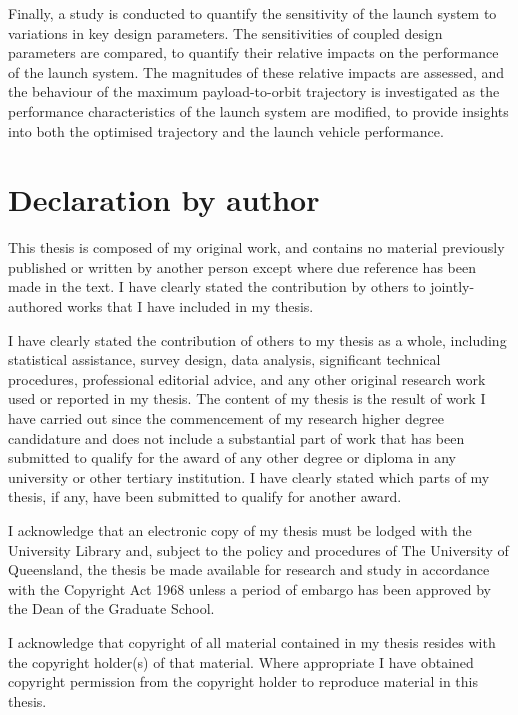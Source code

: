 Finally, a study is conducted to quantify the sensitivity of the launch system to variations in key design parameters. 
The sensitivities of coupled design parameters are compared, to quantify their relative impacts on the performance of the launch system. The magnitudes of these relative impacts are assessed, and the behaviour of the maximum payload-to-orbit trajectory is investigated as the performance characteristics of the launch system are modified, to provide insights into both the optimised trajectory and the launch vehicle performance. 

 

\clearpage
\section*{Declaration by author}

  This thesis is composed of my original work, and contains no material previously published or written by another person except where due reference has been made in the text. I have clearly stated the contribution by others to jointly-authored works that I have included in my thesis.

  I have clearly stated the contribution of others to my thesis as a whole, including statistical assistance, survey design, data analysis, significant technical procedures, professional editorial advice, and any other original research work used or reported in my thesis. The content of my thesis is the result of work I have carried out since the commencement of my research higher degree candidature and does not include a substantial part of work that has been submitted to qualify for the award of any other degree or diploma in any university or other tertiary institution. I have clearly stated which parts of my thesis, if any, have been submitted to qualify for another award.

  I acknowledge that an electronic copy of my thesis must be lodged with the University Library and, subject to the policy and procedures of The University of Queensland, the thesis be made available for research and study in accordance with the Copyright Act 1968 unless a period of embargo has been approved by the Dean of the Graduate School.

  I acknowledge that copyright of all material contained in my thesis resides with the copyright holder(s) of that material. Where appropriate I have obtained copyright permission from the copyright holder to reproduce material in this thesis.

